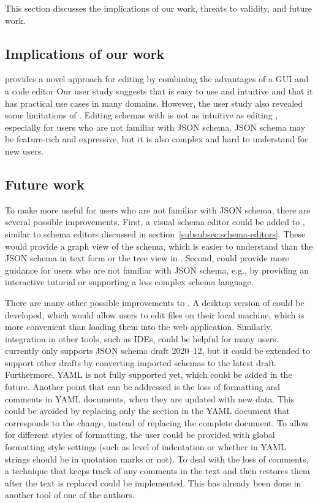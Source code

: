 This section discusses the implications of our work, threats to validity, and future work.


\subsection{Implications of our work}\label{subsec:implications-of-our-work}

\toolname{} provides a novel approach for editing \cfgfiles{}
by combining the advantages of a GUI and a code editor
Our user study suggests that \toolname{} is easy to use and intuitive and
that it has practical use cases in many domains.
However, the user study also revealed some limitations of \toolname{}.
Editing schemas with \toolname{} is not as intuitive as editing \cfgfiles{},
especially for users who are not familiar with JSON schema.
JSON schema may be feature-rich and expressive, but it is also complex and
hard to understand for new users.

\subsection{Future work}\label{subsec:future-work}
To make \toolname{} more useful for users who are not familiar with JSON schema,
there are several possible improvements.
First, a visual schema editor could be added to \toolname{}, similar to schema editors
discussed in section~\ref{subsubsec:schema-editors}.
These would provide a graph view of the schema, which is easier to understand than
the JSON schema in text form or the tree view in \toolname{}.
Second, \toolname{} could provide more guidance for users who are not familiar with JSON schema,
e.g., by providing an interactive tutorial or supporting a less complex schema language.

There are many other possible improvements to \toolname{}.
A desktop version of \toolname{} could be developed, which would allow users to
edit files on their local machine, which is more convenient than loading them into the web application.
Similarly, integration in other tools, such as IDEs, could be helpful for many users.
\toolname{} currently only supports JSON schema draft 2020--12, but it could be extended to support
other drafts by converting imported schemas to the latest draft.
Furthermore, YAML is not fully supported yet, which could be added in the future.
Another point that can be addressed is the loss of formatting and comments in YAML documents, when they are updated with new data.
This could be avoided by replacing only the section in the YAML document that corresponds to the change, instead of replacing the complete document. 
To allow for different styles of formatting, the user could be provided with global formatting style settings (such as level of indentation or whether in YAML strings should be in quotation marks or not).
To deal with the loss of comments, a technique that keeps track of any comments in the text and then restores them after the text is replaced could be implemented. This has already been done in another tool of one of the authors\cite{githubBspEditor}.

